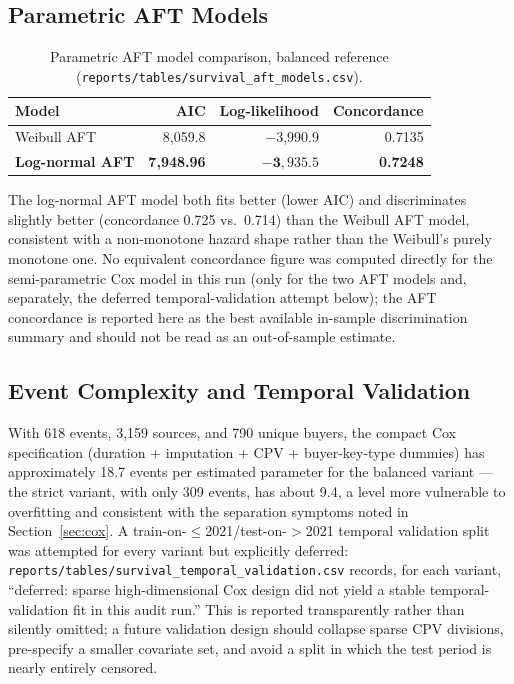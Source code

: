 \documentclass[11pt]{article}
\begin{document}
\subsection{Parametric AFT Models}
\begin{table}[h!]
\centering
\caption{Parametric AFT model comparison, balanced reference
(\texttt{reports/tables/survival\_aft\_models.csv}).}
\begin{tabular}{lrrr}
\toprule
Model & AIC & Log-likelihood & Concordance \\
\midrule
Weibull AFT & 8{,}059.8 & $-$3{,}990.9 & 0.7135 \\
\textbf{Log-normal AFT} & \textbf{7{,}948.96} & $\mathbf{-3{,}935.5}$ & \textbf{0.7248} \\
\bottomrule
\end{tabular}
\end{table}
The log-normal AFT model both fits better (lower AIC) and discriminates
slightly better (concordance 0.725 vs.\ 0.714) than the Weibull AFT model,
consistent with a non-monotone hazard shape rather than the Weibull's
purely monotone one. No equivalent concordance figure was computed directly
for the semi-parametric Cox model in this run (only for the two AFT
models and, separately, the deferred temporal-validation attempt below);
the AFT concordance is reported here as the best available in-sample
discrimination summary and should not be read as an out-of-sample estimate.

\subsection{Event Complexity and Temporal Validation}
With 618 events, 3{,}159 sources, and 790 unique buyers, the compact Cox
specification (duration + imputation + CPV + buyer-key-type dummies) has
approximately 18.7 events per estimated parameter for the balanced variant
--- the strict variant, with only 309 events, has about 9.4, a level more
vulnerable to overfitting and consistent with the separation symptoms noted
in Section~\ref{sec:cox}. A train-on-$\leq$2021/test-on-$>$2021 temporal
validation split was attempted for every variant but explicitly deferred:
\texttt{reports/tables/survival\_temporal\_validation.csv} records, for each
variant, ``deferred: sparse high-dimensional Cox design did not yield a
stable temporal-validation fit in this audit run.'' This is reported
transparently rather than silently omitted; a future validation design
should collapse sparse CPV divisions, pre-specify a smaller covariate set,
and avoid a split in which the test period is nearly entirely censored.
\end{document}
